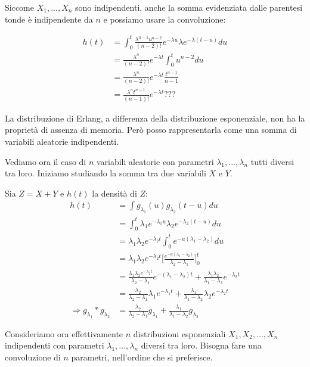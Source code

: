\documentclass[a4paper,12pt]{book}
\begin{document}
Siccome $ X_1, ..., X_n $ sono indipendenti, anche la somma evidenziata dalle parentesi tonde è indipendente da $ n $ e possiamo usare la convoluzione:

\begin{align*}
	h(t) & = \int_{0}^{t}\frac{\lambda^{n-1} u^{n-2}}{(n-2)!} e^{-\lambda u} \lambda e^{-\lambda(t-u)} du \\
	& = \frac{\lambda^n}{(n-2)!}e^{-\lambda t} \int_{0}^{t} u^{n-2} du \\
	& = \frac{\lambda^n}{(n-2)!} e^{-\lambda t} \frac{t^{n-1}}{n-1} \\
	& = \frac{\lambda^n t^{n-1}}{(n-1)!} e^{-\lambda t} ??? %
\end{align*}

La distribuzione di Erlang, a differenza della distribuzione esponenziale, non ha la proprietà di assenza di memoria. Però posso rappresentarla come una somma di variabili aleatorie indipendenti. 

Vediamo ora il caso di $ n $ variabili aleatorie con parametri $ \lambda_1, ..., \lambda_n $ tutti diversi tra loro. Iniziamo studiando la somma tra due variabili $ X $ e $ Y $.

Sia $ Z = X + Y $ e $ h(t) $ la densità di $ Z $:
\begin{align*}
	h(t) & = \int g_{\lambda_1}(u) g_{\lambda_2}(t-u) du \\ %
	& = \int_{0}^{t} \lambda_1e^{-\lambda_1 u} \lambda_2e^{-\lambda_2(t-u)} du \\
	& = \lambda_1\lambda_2e^{-\lambda_2 t} \int_{0}^{t}e^{-u(\lambda_1-\lambda_2)} du \\
	& = \lambda_1\lambda_2e^{-\lambda_2 t} \bigg[\frac{e^{-u(\lambda_1-\lambda_2)}}{\lambda_2 - 
		\lambda_1}\bigg]^{t}_0 \\
	& = \frac{\lambda_1\lambda_2 e^{-\lambda_2 t}}{\lambda_2 - \lambda_1}e^{-(\lambda_1 - \lambda_2)t} + \frac{\lambda_1\lambda_2}{\lambda_1-\lambda_2}e^{-\lambda_2 t} \\
	& = \frac{\lambda_2}{\lambda_2 - \lambda_1} \lambda_1 e^{-\lambda_1 t} + \frac{\lambda_1}{\lambda_1 - \lambda_2}\lambda_2 e^{-\lambda_2t} \\
	\Rightarrow g_{\lambda_1} * g_{\lambda_2} & = \frac{\lambda_2}{\lambda_2 - \lambda_1} g_{\lambda_1} + \frac{\lambda_1}{\lambda_1-\lambda_2}g_{\lambda_2} %
\end{align*}

Consideriamo ora effettivamente $ n $ distribuzioni esponenziali $ X_1, X_2, ..., X_n $ indipendenti con parametri $ \lambda_1, ..., \lambda_n $ diversi tra loro. Bisogna fare una convoluzione di $ n $ parametri, nell'ordine che si preferisce. 
\end{document}
